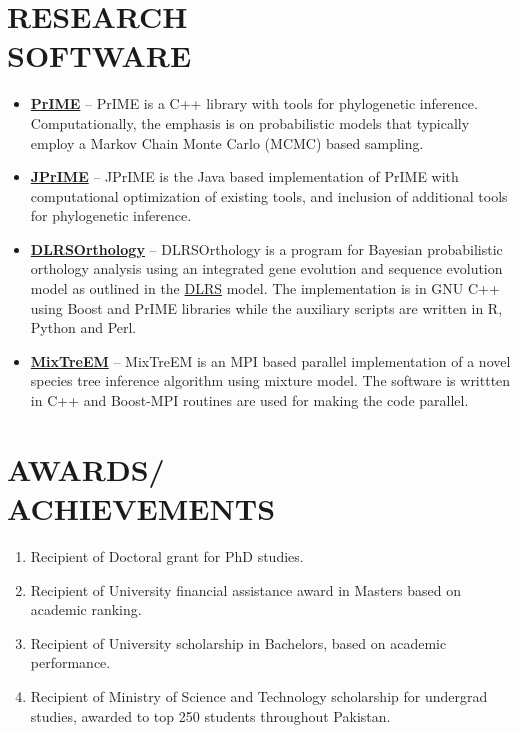 \documentclass[margin, 10pt]{res} %
\begin{document}
\begin{resume}
\section{RESEARCH \\ SOFTWARE} 
\begin{itemize}
\item \textbf{\href{http://prime.scilifelab.se/}{PrIME}} -- PrIME is a C++ library with tools for phylogenetic inference. Computationally, the emphasis is on probabilistic models that typically employ a Markov Chain Monte Carlo (MCMC) based sampling.
\item \textbf{\href{https://code.google.com/p/jprime/}{JPrIME}} -- JPrIME is the Java based implementation of PrIME with computational optimization of existing tools, and inclusion of additional tools for phylogenetic inference.
\item \textbf{\href{http://prime.scilifelab.se/dlrsorthology/}{DLRSOrthology}} -- DLRSOrthology is a program for Bayesian probabilistic orthology analysis using an integrated gene evolution and sequence evolution model as outlined in the \href{http://www.pnas.org/content/106/14/5714.long}{DLRS} model. The implementation is in GNU C++ using Boost and PrIME libraries while the auxiliary scripts are written in R, Python and Perl.
\item \textbf{\href{http://prime.scilifelab.se/mixtreem/}{MixTreEM}} -- MixTreEM is an MPI based parallel implementation of a novel species tree inference algorithm using mixture model. The software is writtten in C++ and Boost-MPI routines are used for making the code parallel.
\end{itemize}


\section{AWARDS/ \\ ACHIEVEMENTS} 

\begin{enumerate}
\item Recipient of Doctoral grant for PhD studies.
\item Recipient of University financial assistance award in Masters based on academic ranking.
\item Recipient of University scholarship in Bachelors, based on academic performance.
\item Recipient of Ministry of Science and Technology scholarship for undergrad studies, awarded to top 250 students throughout Pakistan.
\end{enumerate} 


\end{resume}
\end{document}
